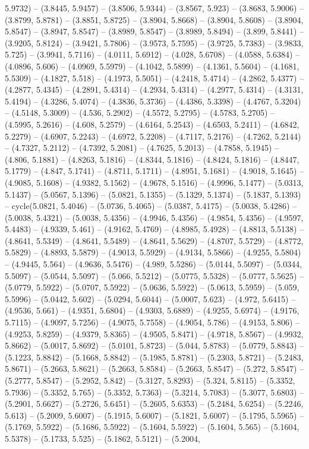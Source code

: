5.9732) -- (3.8445, 5.9457) -- (3.8506, 5.9344) -- (3.8567, 5.923) -- (3.8683, 5.9006) -- (3.8799, 5.8781) -- (3.8851, 5.8725) -- (3.8904, 5.8668) -- (3.8904, 5.8608) -- (3.8904, 5.8547) -- (3.8947, 5.8547) -- (3.8989, 5.8547) -- (3.8989, 5.8494) -- (3.899, 5.8441) -- (3.9205, 5.8124) -- (3.9421, 5.7806) -- (3.9573, 5.7595) -- (3.9725, 5.7383) -- (3.9833, 5.725) -- (3.9941, 5.7116) -- (4.0111, 5.6912) -- (4.028, 5.6708) -- (4.0588, 5.6384) -- (4.0896, 5.606) -- (4.0969, 5.5979) -- (4.1042, 5.5899) -- (4.1361, 5.5604) -- (4.1681, 5.5309) -- (4.1827, 5.518) -- (4.1973, 5.5051) -- (4.2418, 5.4714) -- (4.2862, 5.4377) -- (4.2877, 5.4345) -- (4.2891, 5.4314) -- (4.2934, 5.4314) -- (4.2977, 5.4314) -- (4.3131, 5.4194) -- (4.3286, 5.4074) -- (4.3836, 5.3736) -- (4.4386, 5.3398) -- (4.4767, 5.3204) -- (4.5148, 5.3009) -- (4.536, 5.2902) -- (4.5572, 5.2795) -- (4.5783, 5.2705) -- (4.5995, 5.2616) -- (4.608, 5.2579) -- (4.6164, 5.2543) -- (4.6503, 5.2411) -- (4.6842, 5.2279) -- (4.6907, 5.2243) -- (4.6972, 5.2208) -- (4.7117, 5.2176) -- (4.7262, 5.2144) -- (4.7327, 5.2112) -- (4.7392, 5.2081) -- (4.7625, 5.2013) -- (4.7858, 5.1945) -- (4.806, 5.1881) -- (4.8263, 5.1816) -- (4.8344, 5.1816) -- (4.8424, 5.1816) -- (4.8447, 5.1779) -- (4.847, 5.1741) -- (4.8711, 5.1711) -- (4.8951, 5.1681) -- (4.9018, 5.1645) -- (4.9085, 5.1608) -- (4.9382, 5.1562) -- (4.9678, 5.1516) -- (4.9996, 5.1477) -- (5.0313, 5.1437) -- (5.0567, 5.1396) -- (5.0821, 5.1355) -- (5.1329, 5.1374) -- (5.1837, 5.1393) -- cycle(5.0821, 5.4046) -- (5.0736, 5.4065) -- (5.0387, 5.4175) -- (5.0038, 5.4286) -- (5.0038, 5.4321) -- (5.0038, 5.4356) -- (4.9946, 5.4356) -- (4.9854, 5.4356) -- (4.9597, 5.4483) -- (4.9339, 5.461) -- (4.9162, 5.4769) -- (4.8985, 5.4928) -- (4.8813, 5.5138) -- (4.8641, 5.5349) -- (4.8641, 5.5489) -- (4.8641, 5.5629) -- (4.8707, 5.5729) -- (4.8772, 5.5829) -- (4.8893, 5.5879) -- (4.9013, 5.5929) -- (4.9134, 5.5866) -- (4.9255, 5.5804) -- (4.9445, 5.564) -- (4.9636, 5.5476) -- (4.989, 5.5286) -- (5.0144, 5.5097) -- (5.0344, 5.5097) -- (5.0544, 5.5097) -- (5.066, 5.5212) -- (5.0775, 5.5328) -- (5.0777, 5.5625) -- (5.0779, 5.5922) -- (5.0707, 5.5922) -- (5.0636, 5.5922) -- (5.0613, 5.5959) -- (5.059, 5.5996) -- (5.0442, 5.602) -- (5.0294, 5.6044) -- (5.0007, 5.623) -- (4.972, 5.6415) -- (4.9536, 5.661) -- (4.9351, 5.6804) -- (4.9303, 5.6889) -- (4.9255, 5.6974) -- (4.9176, 5.7115) -- (4.9097, 5.7256) -- (4.9075, 5.7558) -- (4.9054, 5.786) -- (4.9153, 5.806) -- (4.9253, 5.8259) -- (4.9379, 5.8365) -- (4.9505, 5.8471) -- (4.9718, 5.8567) -- (4.9932, 5.8662) -- (5.0017, 5.8692) -- (5.0101, 5.8723) -- (5.044, 5.8783) -- (5.0779, 5.8843) -- (5.1223, 5.8842) -- (5.1668, 5.8842) -- (5.1985, 5.8781) -- (5.2303, 5.8721) -- (5.2483, 5.8671) -- (5.2663, 5.8621) -- (5.2663, 5.8584) -- (5.2663, 5.8547) -- (5.272, 5.8547) -- (5.2777, 5.8547) -- (5.2952, 5.842) -- (5.3127, 5.8293) -- (5.324, 5.8115) -- (5.3352, 5.7936) -- (5.3352, 5.765) -- (5.3352, 5.7363) -- (5.3214, 5.7083) -- (5.3077, 5.6803) -- (5.2901, 5.6627) -- (5.2726, 5.6451) -- (5.2605, 5.6353) -- (5.2484, 5.6254) -- (5.2246, 5.613) -- (5.2009, 5.6007) -- (5.1915, 5.6007) -- (5.1821, 5.6007) -- (5.1795, 5.5965) -- (5.1769, 5.5922) -- (5.1686, 5.5922) -- (5.1604, 5.5922) -- (5.1604, 5.565) -- (5.1604, 5.5378) -- (5.1733, 5.525) -- (5.1862, 5.5121) -- (5.2004, 